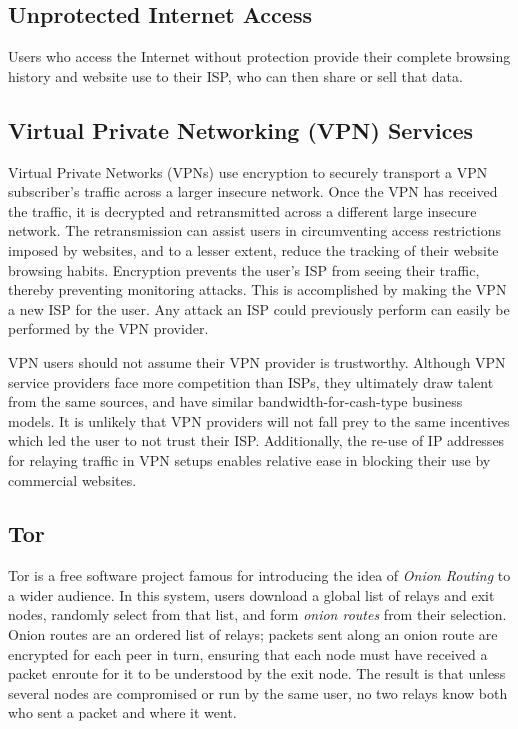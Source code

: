 
\subsection{Unprotected Internet Access}

Users who access the Internet without protection provide their
complete browsing history and website use to their ISP, who can then share or sell that data.

\subsection{Virtual Private Networking (VPN) Services}

Virtual Private Networks (VPNs) use encryption to securely transport a
VPN subscriber's traffic across a larger insecure network. Once the
VPN has received the traffic, it is decrypted and retransmitted across
a different large insecure network. The retransmission can assist
users in circumventing access restrictions imposed by websites, and to
a lesser extent, reduce the tracking of their website browsing
habits. Encryption prevents the user's ISP from seeing their traffic,
thereby preventing monitoring attacks. This is accomplished by making
the VPN a new ISP for the user.  Any attack an ISP could previously
perform can easily be performed by the VPN provider.

VPN users should not assume their VPN provider is trustworthy. Although VPN service providers face more competition
than ISPs, they ultimately draw talent from the same sources, and have
similar bandwidth-for-cash-type business models. It is unlikely that
VPN providers will not fall prey to the same incentives which led the
user to not trust their ISP. Additionally, the re-use of IP addresses
for relaying traffic in VPN setups enables relative ease in blocking
their use by commercial websites\cite{13}.

\subsection{Tor}

Tor\cite{TOR} is a free software project famous for introducing the
idea of \emph{Onion Routing} to a wider audience. In this system, users
download a global list of relays and exit nodes, randomly select from
that list, and form \emph{onion routes} from their selection. Onion
routes are an ordered list of relays; packets sent along an onion
route are encrypted for each peer in turn, ensuring that each node
must have received a packet enroute for it to be understood by the
exit node. The result is that unless several nodes are compromised or
run by the same user, no two relays know both who sent 
a packet and where it went.

